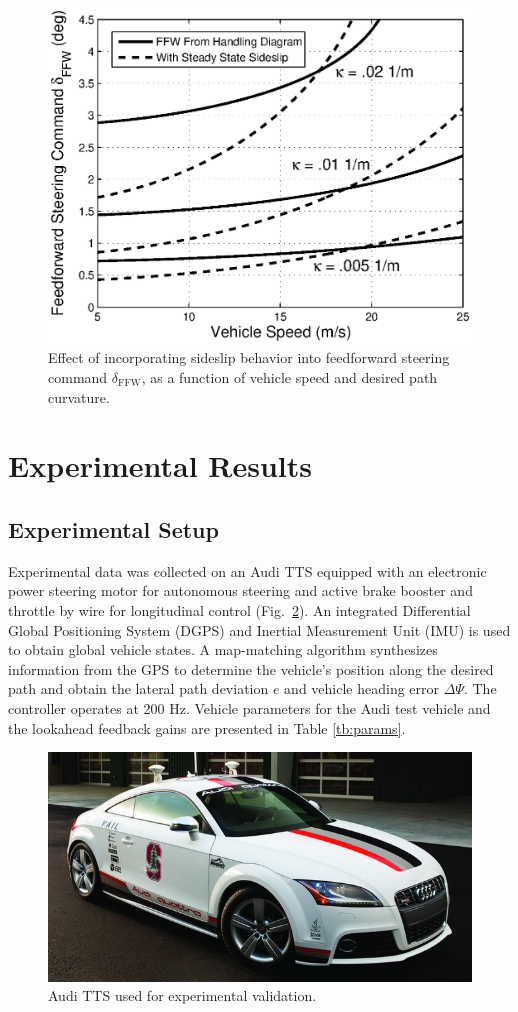 \documentclass{nVSD2e}
\theoremstyle{plain}
\theoremstyle{definition}
\theoremstyle{remark}
\begin{document}
\begin{figure}[h]
\centering
\includegraphics[width=.75\columnwidth]{figures/FFWplot.eps}
\caption{Effect of incorporating sideslip behavior into feedforward steering command $\delta_\mathrm{FFW}$, as a function of 
vehicle speed and desired path curvature.}
\label{fig:ffwplot}
\end{figure}

\section{Experimental Results}

\subsection{Experimental Setup}

Experimental data was collected on an Audi TTS equipped 
with an electronic power steering motor for autonomous steering and active brake booster and throttle by wire for
longitudinal control (Fig.~\ref{fig:shelleyPic}).
An integrated Differential Global Positioning System (DGPS) and Inertial Measurement Unit (IMU) is used to obtain
 global vehicle states. 
A map-matching algorithm synthesizes information 
from the GPS to determine the vehicle's position along the desired path and obtain the lateral path deviation
$e$ and vehicle heading error $\Delta\Psi$. 
The controller operates at 200 Hz. 
Vehicle parameters for the Audi test vehicle and the lookahead feedback gains are presented in Table \ref{tb:params}.


\begin{figure}[h]
\centering
\includegraphics[width=.75\columnwidth]{figures/experimentInfo.jpg}
\caption{Audi TTS used for experimental validation.}
\label{fig:shelleyPic}
\end{figure}
 
\end{document}

